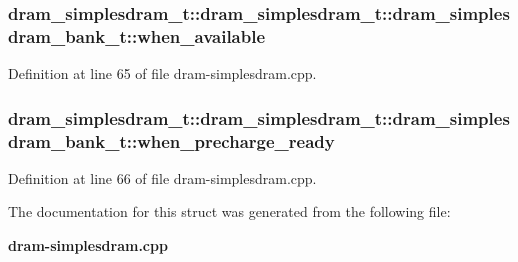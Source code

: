 \subsubsection[{when\_\-available}]{ dram\_\-simplesdram\_\-t::dram\_\-simplesdram\_\-t::dram\_\-simplesdram\_\-bank\_\-t::when\_\-available}\label{structdram__simplesdram__t_1_1dram__simplesdram__bank__t_3ca8390c388a2094a43947a172857df3}




Definition at line 65 of file dram-simplesdram.cpp.
\subsubsection[{when\_\-precharge\_\-ready}]{ dram\_\-simplesdram\_\-t::dram\_\-simplesdram\_\-t::dram\_\-simplesdram\_\-bank\_\-t::when\_\-precharge\_\-ready}\label{structdram__simplesdram__t_1_1dram__simplesdram__bank__t_9e9aeb22897928ef6271726bff3b6760}




Definition at line 66 of file dram-simplesdram.cpp.

The documentation for this struct was generated from the following file:\begin{CompactItemize}
\item 
{\bf dram-simplesdram.cpp}\end{CompactItemize}

